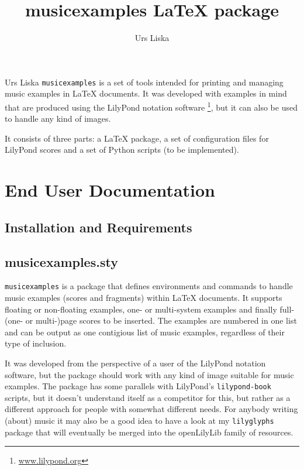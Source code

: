 \documentclass{OLLbook}
\title{musicexamples \LaTeX{} package}
\author{Urs Liska}
\begin{document}
\maketitle
\begin{authorAbstract}{Urs Liska}
\texttt{musicexamples} is a set of tools intended for printing and managing music examples in \LaTeX{} documents.
It was developed with examples in mind that are produced using the LilyPond notation software%
\footnote{\url{www.lilypond.org}},
but it can also be used to handle any kind of images.

It consists of three parts: a \LaTeX{} package, a set of configuration files for LilyPond scores and a set of Python scripts (to be implemented).
\end{authorAbstract}

\vfill


\tableofcontents

\chapter{End User Documentation}
\section{Installation and Requirements}

\section{musicexamples.sty}

\texttt{musicexamples} is a package that defines environments and commands to handle music examples (scores and fragments) within \LaTeX{} documents.
It supports floating or non-floating examples, one- or multi-system examples and finally full-(one- or multi-)page scores to be inserted.
The examples are numbered in one list and can be output as one contigious list of music examples, regardless of their type of inclusion.

It was developed from the perspective of a user of the LilyPond notation software, but the package should work with any kind of image suitable for music examples.
The package has some parallels with LilyPond's \texttt{lilypond-book} scripts, but it doesn't understand itself as a competitor for this, but rather as a different approach for people with somewhat different needs.
For anybody writing (about) music it may also be a good idea to have a look at my \texttt{lilyglyphs} package that will eventually be merged into the openLilyLib family of resources.
\end{document}
